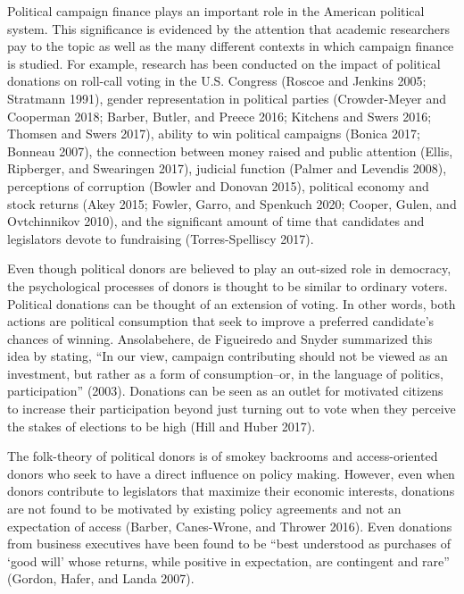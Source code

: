 \documentclass[12pt,]{article}
\begin{document}
\vskip -8.5pt



\noindent \doublespacing 

Political campaign finance plays an important role in the American
political system. This significance is evidenced by the attention that
academic researchers pay to the topic as well as the many different
contexts in which campaign finance is studied. For example, research has
been conducted on the impact of political donations on roll-call voting
in the U.S. Congress (Roscoe and Jenkins 2005; Stratmann 1991), gender
representation in political parties (Crowder-Meyer and Cooperman 2018;
Barber, Butler, and Preece 2016; Kitchens and Swers 2016; Thomsen and
Swers 2017), ability to win political campaigns (Bonica 2017; Bonneau
2007), the connection between money raised and public attention (Ellis,
Ripberger, and Swearingen 2017), judicial function (Palmer and Levendis
2008), perceptions of corruption (Bowler and Donovan 2015), political
economy and stock returns (Akey 2015; Fowler, Garro, and Spenkuch 2020;
Cooper, Gulen, and Ovtchinnikov 2010), and the significant amount of
time that candidates and legislators devote to fundraising
(Torres-Spelliscy 2017).

Even though political donors are believed to play an out-sized role in
democracy, the psychological processes of donors is thought to be
similar to ordinary voters. Political donations can be thought of an
extension of voting. In other words, both actions are political
consumption that seek to improve a preferred candidate's chances of
winning. Ansolabehere, de Figueiredo and Snyder summarized this idea by
stating, ``In our view, campaign contributing should not be viewed as an
investment, but rather as a form of consumption--or, in the language of
politics, participation'' (2003). Donations can be seen as an outlet for
motivated citizens to increase their participation beyond just turning
out to vote when they perceive the stakes of elections to be high (Hill
and Huber 2017).

The folk-theory of political donors is of smokey backrooms and
access-oriented donors who seek to have a direct influence on policy
making. However, even when donors contribute to legislators that
maximize their economic interests, donations are not found to be
motivated by existing policy agreements and not an expectation of access
(Barber, Canes-Wrone, and Thrower 2016). Even donations from business
executives have been found to be ``best understood as purchases of `good
will' whose returns, while positive in expectation, are contingent and
rare'' (Gordon, Hafer, and Landa 2007).
\end{document}
